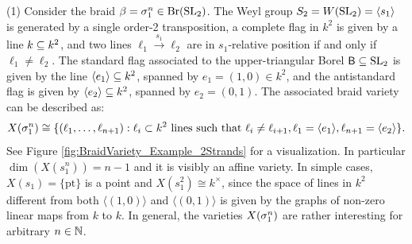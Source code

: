 \begin{example}\label{ex:simple_braidvarieties}
(1) Consider the braid $\beta=\sigma_1^n\in\text{Br}(\operatorname{SL}_2)$. The Weyl group $S_2=W(\operatorname{SL}_2)=\langle s_1\rangle$ is generated by a single order-2 transposition, a complete flag in $k^2$ is given by a line $k\subseteq k^2$, and two lines $\ell_1\stackrel{s_1}{\to}\ell_2$ are in $s_1$-relative position if and only if $\ell_1\neq\ell_2$. The standard flag associated to the upper-triangular Borel $\mathsf{B}\subseteq \operatorname{SL}_2$ is given by the line $\langle e_1\rangle\subseteq k^2$, spanned by $e_1=(1,0)\in k^2$, and the antistandard flag is given by $\langle e_2\rangle\subseteq k^2$, spanned by $e_2=(0,1)$. The associated braid variety can be described as:
$$X(\sigma_1^n)\cong\{(\ell_1,\ldots,\ell_{n+1}):\ell_i\subset k^2\mbox{ lines such that }\ell_i\neq\ell_{i+1}, \ell_1=\langle e_1\rangle,\ell_{n+1}=\langle e_2\rangle\}.$$
See Figure \ref{fig:BraidVariety_Example_2Strands} for a visualization. In particular $\dim(X(s_1^n))=n-1$ and it is visibly an affine variety. In simple cases, $X(s_1)=\{\mbox{pt}\}$ is a point and $X(s_1^2)\cong k^\times$, since the space of lines in $k^2$ different from both $\langle(1,0)\rangle$ and $\langle(0,1)\rangle$ is given by the graphs of non-zero linear maps from $k$ to $k$. In general, the varieties $X(\sigma_1^n)$ are rather interesting for arbitrary $n\in\mathbb{N}$.\\


\end{example}
